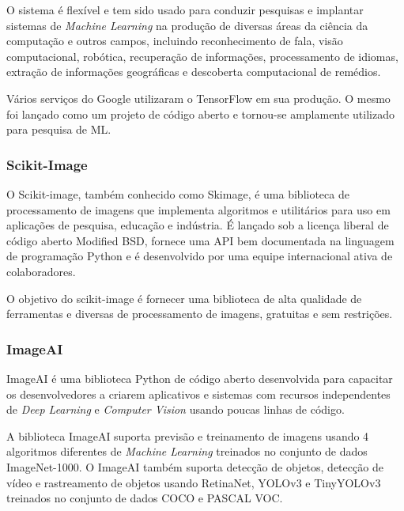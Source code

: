 O sistema é flexível e tem sido usado para conduzir pesquisas e implantar sistemas de \textit{Machine Learning} na produção de diversas áreas da ciência da computação e outros campos, incluindo reconhecimento de fala, visão computacional, robótica, recuperação de informações, processamento de idiomas, extração de informações geográficas e descoberta computacional de remédios. \cite{abadi2016tensorflow}

Vários serviços do Google utilizaram o TensorFlow em sua produção. O mesmo foi lançado como um projeto de código aberto e tornou-se amplamente utilizado para pesquisa de ML.\cite{199317}


\subsubsection{Scikit-Image}

O Scikit-image, também conhecido como Skimage, é uma biblioteca de processamento de imagens que implementa algoritmos e utilitários para uso em aplicações de pesquisa, educação e indústria. É lançado sob a licença liberal de código aberto Modified BSD, fornece uma API bem documentada na linguagem de programação Python e é desenvolvido por uma equipe internacional ativa de colaboradores.

O objetivo do scikit-image é fornecer uma biblioteca de alta qualidade de ferramentas e diversas de processamento de imagens, gratuitas e sem restrições. \cite{skimage}


\subsubsection{ImageAI}

ImageAI é uma biblioteca Python de código aberto desenvolvida para capacitar os desenvolvedores a criarem aplicativos e sistemas com recursos independentes de \textit{Deep Learning} e \textit{Computer Vision} usando poucas linhas de código.

A biblioteca ImageAI suporta previsão e treinamento de imagens usando 4 algoritmos diferentes de \textit{Machine Learning} treinados no conjunto de dados ImageNet-1000. O ImageAI também suporta detecção de objetos, detecção de vídeo e rastreamento de objetos usando RetinaNet, YOLOv3 e TinyYOLOv3 treinados no conjunto de dados COCO e PASCAL VOC.\cite{ImageAI}

